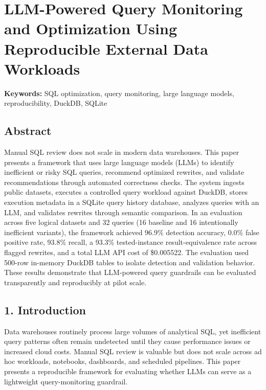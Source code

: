 \section{LLM-Powered Query Monitoring and Optimization Using
Reproducible External Data
Workloads}\label{llm-powered-query-monitoring-and-optimization-using-reproducible-external-data-workloads}

\textbf{Keywords:} SQL optimization, query monitoring, large language
models, reproducibility, DuckDB, SQLite

\subsection{Abstract}\label{abstract}

Manual SQL review does not scale in modern data warehouses. This paper
presents a framework that uses large language models (LLMs) to identify
inefficient or risky SQL queries, recommend optimized rewrites, and
validate recommendations through automated correctness checks. The
system ingests public datasets, executes a controlled query workload
against DuckDB, stores execution metadata in a SQLite query history
database, analyzes queries with an LLM, and validates rewrites through
semantic comparison. In an evaluation across five logical datasets and
32 queries (16 baseline and 16 intentionally inefficient variants), the
framework achieved 96.9\% detection accuracy, 0.0\% false positive rate,
93.8\% recall, a 93.3\% tested-instance result-equivalence rate across
flagged rewrites, and a total LLM API cost of \$0.005522. The evaluation
used 500-row in-memory DuckDB tables to isolate detection and validation
behavior. These results demonstrate that LLM-powered query guardrails can
be evaluated transparently and reproducibly at pilot scale.

\subsection{1. Introduction}\label{introduction}

Data warehouses routinely process large volumes of analytical SQL, yet
inefficient query patterns often remain undetected until they cause
performance issues or increased cloud costs. Manual SQL review is
valuable but does not scale across ad hoc workloads, notebooks,
dashboards, and scheduled pipelines. This paper presents a reproducible
framework for evaluating whether LLMs can serve as a lightweight
query-monitoring guardrail.

